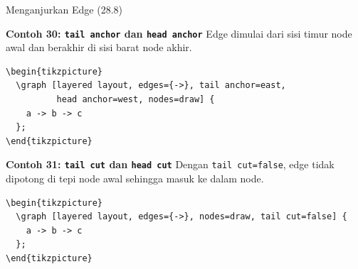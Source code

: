 \documentclass[aspectratio=169]{beamer}
\begin{document}
\begin{frame}{Menganjurkan Edge (28.8)}


\textbf{Contoh 30: \texttt{tail anchor} dan \texttt{head anchor}}
Edge dimulai dari sisi timur node awal dan berakhir di sisi barat node akhir.
\begin{lstlisting}
\begin{tikzpicture}
  \graph [layered layout, edges={->}, tail anchor=east,
          head anchor=west, nodes=draw] {
    a -> b -> c
  };
\end{tikzpicture}
\end{lstlisting}
\begin{center}\end{center}


\textbf{Contoh 31: \texttt{tail cut} dan \texttt{head cut}}
Dengan \texttt{tail cut=false}, edge tidak dipotong di tepi node awal sehingga masuk ke dalam node.
\begin{lstlisting}
\begin{tikzpicture}
  \graph [layered layout, edges={->}, nodes=draw, tail cut=false] {
    a -> b -> c
  };
\end{tikzpicture}
\end{lstlisting}
\begin{center}\end{center}


\end{frame}
\end{document}

